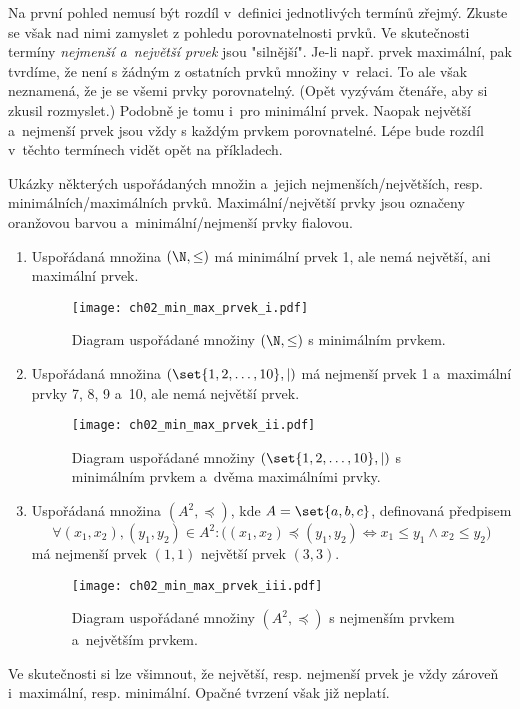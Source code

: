 Na první pohled nemusí být rozdíl v~definici jednotlivých termínů zřejmý. Zkuste se však nad nimi zamyslet z pohledu porovnatelnosti prvků. Ve skutečnosti termíny \emph{nejmenší a~největší prvek} jsou "silnější". Je-li např. prvek maximální, pak tvrdíme, že není s žádným z ostatních prvků množiny v~relaci. To ale však neznamená, že je se všemi prvky porovnatelný. (Opět vyzývám čtenáře, aby si zkusil rozmyslet.) Podobně je tomu i~pro minimální prvek. Naopak největší a~nejmenší prvek jsou vždy s každým prvkem porovnatelné. Lépe bude rozdíl v~těchto termínech vidět opět na příkladech.
\begin{example}\label{ex:min_max_prvek}
    \sloppy Ukázky některých uspořádaných množin a~jejich nejmenších/největších, resp. minimálních/maximálních prvků. Maximální/největší prvky jsou označeny oranžovou barvou a~minimální/nejmenší prvky fialovou. 
    \begin{enumerate}[label=(\roman*)]
        \item\label{item:min_max_prvek_i} Uspořádaná množina $(\N,\leq)$ má minimální prvek 1, ale nemá největší, ani maximální prvek.
        \begin{figure}[H]
            \centering
            \texttt{[image: ch02\_min\_max\_prvek\_i.pdf]}
            \caption{Diagram uspořádané množiny $(\N,\leq)$ s minimálním prvkem.}
            \label{fig:min_max_prvek_i}
        \end{figure}
        \item\label{item:min_max_prvek_ii} Uspořádaná množina $(\set{1,2,\dots,10},\mid)$ má nejmenší prvek 1 a~maximální prvky 7, 8, 9 a~10, ale nemá největší prvek.
        \begin{figure}[H]
            \centering
            \texttt{[image: ch02\_min\_max\_prvek\_ii.pdf]}
            \caption{Diagram uspořádané množiny $(\set{1,2,\dots,10},\mid)$ s minimálním prvkem a~dvěma maximálními prvky.}
            \label{fig:min_max_prvek_ii}
        \end{figure}
        \item\label{item:min_max_prvek_iii} Uspořádaná množina $(A^2,\preceq)$, kde $A=\set{a,b,c}$, definovaná předpisem
        \begin{equation*}
            \forall (x_1,x_2),(y_1,y_2)\in A^2: \bigl((x_1,x_2)\preceq (y_1,y_2) \iff x_1\leq y_1 \land x_2\leq y_2\bigr)
        \end{equation*}
        má nejmenší prvek $(1,1)$ největší prvek $(3,3)$.
        \begin{figure}[H]
            \centering
            \texttt{[image: ch02\_min\_max\_prvek\_iii.pdf]}
            \caption{Diagram uspořádané množiny $(A^2,\preceq)$ s nejmenším prvkem a~největším prvkem.}
            \label{fig:min_max_prvek_iii}
        \end{figure}
    \end{enumerate}
\end{example}
Ve skutečnosti si lze všimnout, že největší, resp. nejmenší prvek je vždy zároveň i~maximální, resp. minimální. Opačné tvrzení však již neplatí.